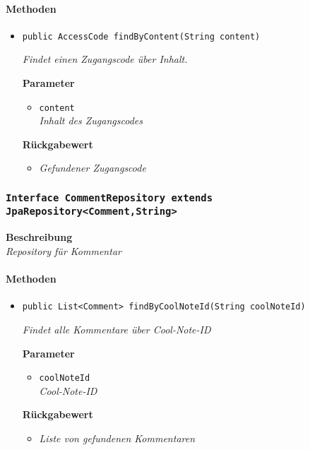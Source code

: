      \paragraph*{Methoden}
     \begin{itemize}
     	\item{\texttt{public AccessCode findByContent(String content)}}
     	
     	\textit{Findet einen Zugangscode über Inhalt.}
     	
     	\textbf{Parameter}
     	\begin{itemize}
     		\item\texttt{content}\\
     		\textit{Inhalt des Zugangscodes}
     	\end{itemize}
     	
     	\textbf{Rückgabewert}
     	\begin{itemize}
     		\item\textit{Gefundener Zugangscode}
     	\end{itemize}
     \end{itemize}
     \subsubsection{\texttt{Interface CommentRepository extends JpaRepository<Comment,String>}}
     \textbf{Beschreibung} \\
     \textit{Repository für Kommentar}
     \paragraph*{Methoden}
     \begin{itemize}
     	\item{\texttt{public List<Comment> findByCoolNoteId(String coolNoteId)}}
     	
     	\textit{Findet alle Kommentare über Cool-Note-ID}
     	
     	\textbf{Parameter}
     	\begin{itemize}
     		\item\texttt{coolNoteId}\\
     		\textit{Cool-Note-ID}
     	\end{itemize}
     	
     	\textbf{Rückgabewert}
     	\begin{itemize}
     		\item\textit{Liste von gefundenen Kommentaren}
     	\end{itemize}
     \end{itemize}

